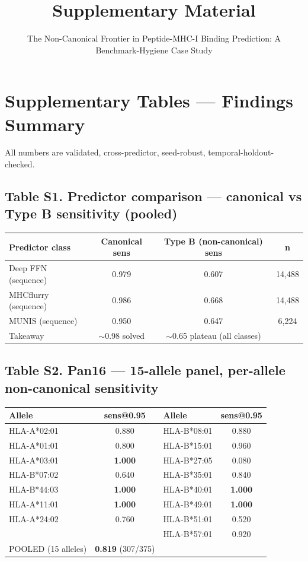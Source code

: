 \documentclass[11pt]{article}
\title{\Large\bfseries Supplementary Material}
\author{The Non-Canonical Frontier in Peptide-MHC-I Binding Prediction: A Benchmark-Hygiene Case Study}
\date{}
\begin{document}
\maketitle

\section*{Supplementary Tables --- Findings Summary}
All numbers are validated, cross-predictor, seed-robust, temporal-holdout-checked.

\subsection*{Table S1. Predictor comparison --- canonical vs Type B sensitivity (pooled)}
\begin{table}[h]
\centering
\begin{tabular}{@{}lccc@{}}
\toprule
Predictor class & Canonical sens & Type B (non-canonical) sens & n \\
\midrule
Deep FFN (sequence) & 0.979 & 0.607 & 14,488 \\
MHCflurry (sequence) & 0.986 & 0.668 & 14,488 \\
MUNIS (sequence) & 0.950 & 0.647 & 6,224 \\
Takeaway & $\sim$0.98 solved & $\sim$0.65 plateau (all classes) & \\
\bottomrule
\end{tabular}
\end{table}

\subsection*{Table S2. Pan16 --- 15-allele panel, per-allele non-canonical sensitivity}
\begin{table}[h]
\centering
\begin{tabular}{@{}lclc@{}}
\toprule
Allele & sens@0.95 & Allele & sens@0.95 \\
\midrule
HLA-A*02:01 & 0.880 & HLA-B*08:01 & 0.880 \\
HLA-A*01:01 & 0.800 & HLA-B*15:01 & 0.960 \\
HLA-A*03:01 & \textbf{1.000} & HLA-B*27:05 & 0.080 \\
HLA-B*07:02 & 0.640 & HLA-B*35:01 & 0.840 \\
HLA-B*44:03 & \textbf{1.000} & HLA-B*40:01 & \textbf{1.000} \\
HLA-A*11:01 & \textbf{1.000} & HLA-B*49:01 & \textbf{1.000} \\
HLA-A*24:02 & 0.760 & HLA-B*51:01 & 0.520 \\
 &  & HLA-B*57:01 & 0.920 \\
POOLED (15 alleles) & \textbf{0.819} (307/375) &  &  \\
\bottomrule
\end{tabular}
\end{table}
\end{document}
